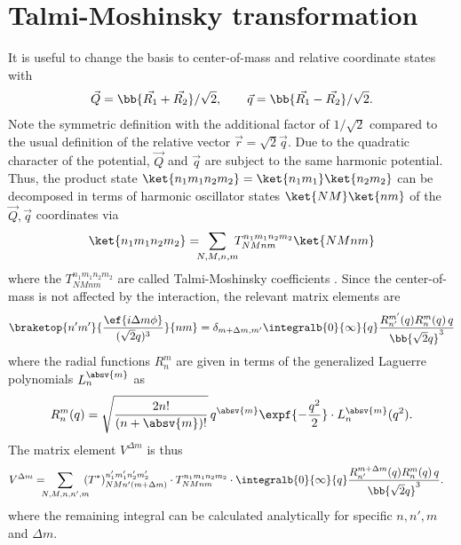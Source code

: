 \section{Talmi-Moshinsky transformation}
It is useful to change the basis to center-of-mass and relative coordinate states with
\begin{align*}
\vec{Q} = \bb{\vec{R_1} + \vec{R_2}}/\sqrt{2}, \qquad \vec{q} = \bb{\vec{R_1} - \vec{R_2}}/\sqrt{2}.
\end{align*}
Note the symmetric definition with the additional factor of $1/\sqrt{2}$ compared to the usual definition of the relative vector $\vec{r} = \sqrt{2} \vec{q}$.
Due to the quadratic character of the potential, $\vec{Q}$ and $\vec{q}$ are subject to the same harmonic potential. Thus, the product state $\ket{n_1m_1n_2m_2}=\ket{n_1m_1}\ket{n_2m_2}$ can be decomposed in terms of harmonic oscillator states $\ket{NM}\ket{nm}$ of the $\vec{Q},\vec{q}$ coordinates via
\begin{align*}
\ket{n_1m_1n_2m_2} = \!\!\! \sum_{N,M,n,m} \!\!\! T^{n_1m_1n_2m_2}_{NMnm} \ket{NMnm}
\end{align*}
where the $T^{n_1m_1n_2m_2}_{NMnm}$ are called Talmi-Moshinsky coefficients \cite{Moshinsky1959,Talmi1952}. Since the center-of-mass is not affected by the interaction, the relevant matrix elements are
\begin{align*}
\braketop{n'm'}{\frac{\ef{i\Delta m \phi}}{(\sqrt{2} q)^3}}{nm} = \delta_{m+\Delta m,m'} \integralb{0}{\infty}{q} \frac{R_{n'}^{m'}(q) R_n^m(q) \,q}{\bb{\sqrt{2} q}^3}
\end{align*}
where the radial functions $R_n^m$ are given in terms of the generalized Laguerre polynomials $L_n^{\absv{m}}$ as
\begin{align*}
R_n^m(q) = \sqrt{\frac{2n!}{(n+\absv{m})!}}\, q^{\absv{m}}\expf{-\frac{q^2}{2}}\cdot L_n^{\absv{m}}(q^2).
\end{align*}
The matrix element $V^{\Delta m}$ is thus
\begin{align*}
V^{\Delta m}= \!\!\! &\sum_{N,M,n,n',m} \!\!\! (T^*)^{n_1'm_1'n_2'm_2'}_{NMn'(m+\Delta m)} \cdot T^{n_1m_1n_2m_2}_{NMnm} \cdot
 \integralb{0}{\infty}{q} \frac{R_{n'}^{m+\Delta m}(q) R_n^m(q) \,q}{\bb{\sqrt{2} q}^3}.
\end{align*}
where the remaining integral can be calculated analytically for specific $n,n',m$ and $\Delta m$.

